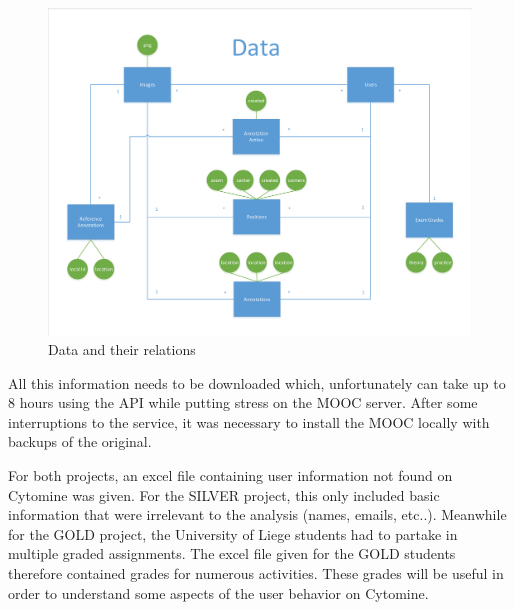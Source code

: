 \documentclass[a4paper,11pt]{report}
\numberwithin{figure}{chapter} %
\begin{document}
       \begin{figure}[H]
        \centering
         \includegraphics[width=.9\linewidth]{diagrams/dataDiagram.pdf}
         \caption{Data and their relations}
         \label{fig:data}
       \end{figure}


		All this information needs to be downloaded which, unfortunately can take up to 8 hours using the API while putting stress on the MOOC server.
		After some interruptions to the service, it was necessary to install the MOOC locally with backups of the original. \newline


        For both projects, an excel file containing user information not found on Cytomine was given.
        For the SILVER project, this only included basic information that were irrelevant to the analysis (names, emails, etc..).
        Meanwhile for the GOLD project, the University of Liege students had to partake in multiple graded assignments.
        The excel file given for the GOLD students therefore contained grades for numerous activities.
        These grades will be useful in order to understand some aspects of the user behavior on Cytomine. \newline
\end{document}
